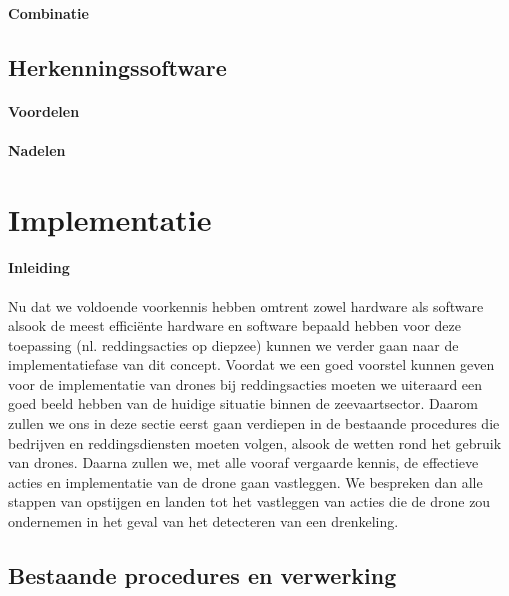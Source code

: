 \lipsum[1-2]

\paragraph{Combinatie}

\lipsum[1-2]

\subsection{Herkenningssoftware}

\paragraph{Voordelen}

\lipsum[1-2]

\paragraph{Nadelen}

\lipsum[1-2]

\section{Implementatie}

\paragraph{Inleiding}

Nu dat we voldoende voorkennis hebben omtrent zowel hardware als software alsook de meest efficiënte hardware en software bepaald hebben voor deze toepassing (nl. reddingsacties op diepzee) kunnen we verder gaan naar de implementatiefase van dit concept. Voordat we een goed voorstel kunnen geven voor de implementatie van drones bij reddingsacties moeten we uiteraard een goed beeld hebben van de huidige situatie binnen de zeevaartsector. Daarom zullen we ons in deze sectie eerst gaan verdiepen in de bestaande procedures die bedrijven en reddingsdiensten moeten volgen, alsook de wetten rond het gebruik van drones. Daarna zullen we, met alle vooraf vergaarde kennis, de effectieve acties en implementatie van de drone gaan vastleggen. We bespreken dan alle stappen van opstijgen en landen tot het vastleggen van acties die de drone zou ondernemen in het geval van het detecteren van een drenkeling. 

\subsection{Bestaande procedures en verwerking}


